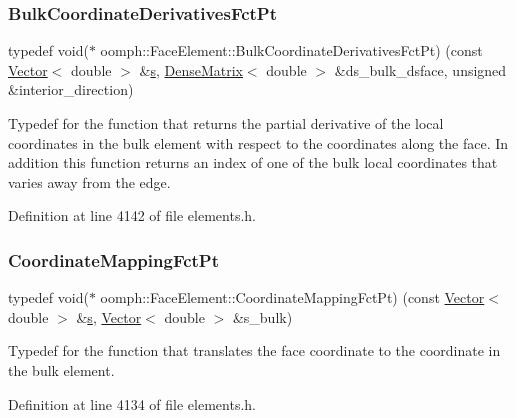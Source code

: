 \subsubsection{\texorpdfstring{Bulk\+Coordinate\+Derivatives\+Fct\+Pt}{BulkCoordinateDerivativesFctPt}}
{\footnotesize\ttfamily typedef void($\ast$ oomph\+::\+Face\+Element\+::\+Bulk\+Coordinate\+Derivatives\+Fct\+Pt) (const \hyperlink{classoomph_1_1Vector}{Vector}$<$ double $>$ \&\hyperlink{cfortran_8h_ab7123126e4885ef647dd9c6e3807a21c}{s}, \hyperlink{classoomph_1_1DenseMatrix}{Dense\+Matrix}$<$ double $>$ \&ds\+\_\+bulk\+\_\+dsface, unsigned \&interior\+\_\+direction)\hspace{0.3cm}{\ttfamily [private]}}



Typedef for the function that returns the partial derivative of the local coordinates in the bulk element with respect to the coordinates along the face. In addition this function returns an index of one of the bulk local coordinates that varies away from the edge. 



Definition at line 4142 of file elements.\+h.

\mbox{\label{classoomph_1_1FaceElement_aaa3af8b5d2e9584bdcd9b133990d7591}} 
\subsubsection{\texorpdfstring{Coordinate\+Mapping\+Fct\+Pt}{CoordinateMappingFctPt}}
{\footnotesize\ttfamily typedef void($\ast$ oomph\+::\+Face\+Element\+::\+Coordinate\+Mapping\+Fct\+Pt) (const \hyperlink{classoomph_1_1Vector}{Vector}$<$ double $>$ \&\hyperlink{cfortran_8h_ab7123126e4885ef647dd9c6e3807a21c}{s}, \hyperlink{classoomph_1_1Vector}{Vector}$<$ double $>$ \&s\+\_\+bulk)\hspace{0.3cm}{\ttfamily [private]}}



Typedef for the function that translates the face coordinate to the coordinate in the bulk element. 



Definition at line 4134 of file elements.\+h.



